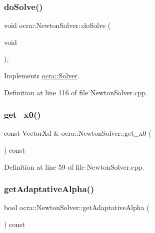 \subsubsection{\texorpdfstring{do\+Solve()}{doSolve()}}
{\footnotesize\ttfamily void ocra\+::\+Newton\+Solver\+::do\+Solve (\begin{DoxyParamCaption}\item[{void}]{ }\end{DoxyParamCaption})\hspace{0.3cm}{\ttfamily [protected]}, {\ttfamily [virtual]}}



Implements \hyperlink{classocra_1_1Solver_ace2d7cfe741611de6dc87a0de7e7f3a9}{ocra\+::\+Solver}.



Definition at line 116 of file Newton\+Solver.\+cpp.

\hypertarget{classocra_1_1NewtonSolver_a073daf2d70c780313d28d34e6c8bbea2}{}\label{classocra_1_1NewtonSolver_a073daf2d70c780313d28d34e6c8bbea2} 
\subsubsection{\texorpdfstring{get\+\_\+x0()}{get\_x0()}}
{\footnotesize\ttfamily const Vector\+Xd \& ocra\+::\+Newton\+Solver\+::get\+\_\+x0 (\begin{DoxyParamCaption}{ }\end{DoxyParamCaption}) const}



Definition at line 59 of file Newton\+Solver.\+cpp.

\hypertarget{classocra_1_1NewtonSolver_aa0f49d597e69f641c28e35b038e91d99}{}\label{classocra_1_1NewtonSolver_aa0f49d597e69f641c28e35b038e91d99} 
\subsubsection{\texorpdfstring{get\+Adaptative\+Alpha()}{getAdaptativeAlpha()}}
{\footnotesize\ttfamily bool ocra\+::\+Newton\+Solver\+::get\+Adaptative\+Alpha (\begin{DoxyParamCaption}{ }\end{DoxyParamCaption}) const}



